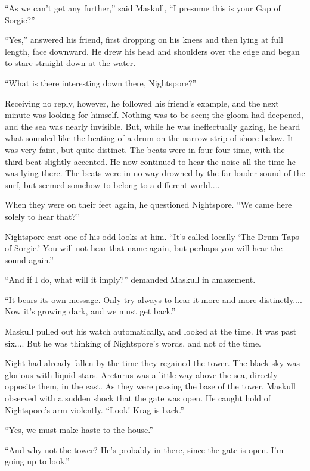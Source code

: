 ``As we can't get any further,'' said Maskull, ``I presume this is your Gap of Sorgie?''

``Yes,'' answered his friend, first dropping on his knees and then lying at full length, face downward. He drew his head and shoulders over the edge and began to stare straight down at the water.

``What is there interesting down there, Nightspore?''

Receiving no reply, however, he followed his friend's example, and the next minute was looking for himself. Nothing was to be seen; the gloom had deepened, and the sea was nearly invisible. But, while he was ineffectually gazing, he heard what sounded like the beating of a drum on the narrow strip of shore below. It was very faint, but quite distinct. The beats were in four-four time, with the third beat slightly accented. He now continued to hear the noise all the time he was lying there. The beats were in no way drowned by the far louder sound of the surf, but seemed somehow to belong to a different world....

When they were on their feet again, he questioned Nightspore. ``We came here solely to hear that?''

Nightspore cast one of his odd looks at him. ``It's called locally ‘The Drum Taps of Sorgie.' You will not hear that name again, but perhaps you will hear the sound again.''

``And if I do, what will it imply?'' demanded Maskull in amazement.

``It bears its own message. Only try always to hear it more and more distinctly.... Now it's growing dark, and we must get back.''

Maskull pulled out his watch automatically, and looked at the time. It was past six.... But he was thinking of Nightspore's words, and not of the time.

\introend

Night had already fallen by the time they regained the tower. The black sky was glorious with liquid stars. Arcturus was a little way above the sea, directly opposite them, in the east. As they were passing the base of the tower, Maskull observed with a sudden shock that the gate was open. He caught hold of Nightspore's arm violently. ``Look! Krag is back.''

``Yes, we must make haste to the house.''

``And why not the tower? He's probably in there, since the gate is open. I'm going up to look.''

